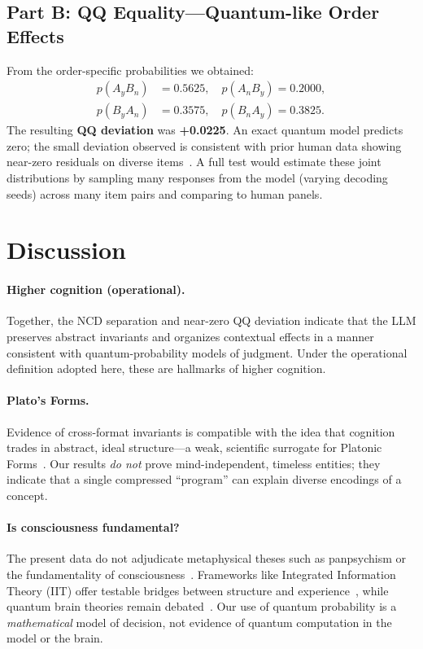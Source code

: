 \documentclass[11pt]{article}
\begin{document}
\subsection{Part B: QQ Equality---Quantum-like Order Effects}
From the order-specific probabilities we obtained:
\begin{align*}
p(A_yB_n) &= 0.5625, \quad
p(A_nB_y) = 0.2000, \\
p(B_yA_n) &= 0.3575, \quad
p(B_nA_y) = 0.3825.
\end{align*}
The resulting \textbf{QQ deviation} was \textbf{+0.0225}. 
An exact quantum model predicts zero; the small deviation observed is consistent with prior human data showing near-zero residuals on diverse items~\citep{Wang2014QQ}. 
A full test would estimate these joint distributions by sampling many responses from the model (varying decoding seeds) across many item pairs and comparing to human panels.

\section{Discussion}
\paragraph{Higher cognition (operational).} 
Together, the NCD separation and near-zero QQ deviation indicate that the LLM preserves abstract invariants and organizes contextual effects in a manner consistent with quantum-probability models of judgment.
Under the operational definition adopted here, these are hallmarks of higher cognition.

\paragraph{Plato's Forms.} 
Evidence of cross-format invariants is compatible with the idea that cognition trades in abstract, ideal structure---a weak, scientific surrogate for Platonic Forms~\citep{PlatoCompleteWorks1997}.
Our results \emph{do not} prove mind-independent, timeless entities; they indicate that a single compressed ``program'' can explain diverse encodings of a concept.

\paragraph{Is consciousness fundamental?} 
The present data do not adjudicate metaphysical theses such as panpsychism or the fundamentality of consciousness~\citep{Goff2017}.
Frameworks like Integrated Information Theory (IIT) offer testable bridges between structure and experience~\citep{Oizumi2014IIT3}, while quantum brain theories remain debated~\citep{HameroffPenrose2014}. 
Our use of quantum probability is a \emph{mathematical} model of decision, not evidence of quantum computation in the model or the brain.
\end{document}
